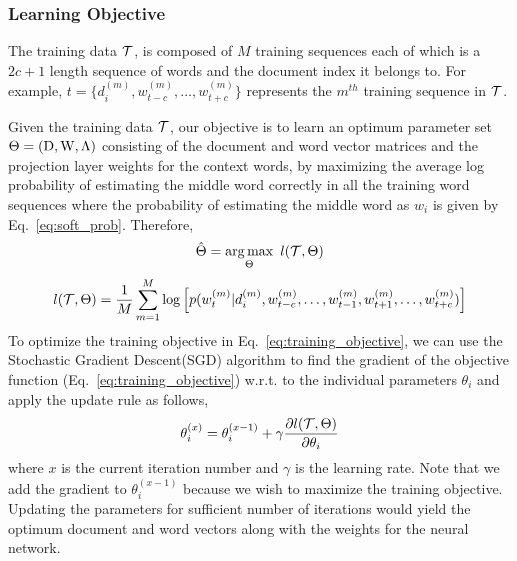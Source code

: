 \subsubsection{Learning Objective}
The training data $\mathcal{T}$, is composed of $M$ training sequences each of which is a $2c+1$ length sequence of words and the document index it belongs to. For example, $t = \{d^{(m)}_{i}, w^{(m)}_{t-c}, \ldots, w^{(m)}_{t+c}\}$ represents the $m^{th}$ training sequence in $\mathcal{T}$.  

Given the training data $\mathcal{T}$, our objective is to learn an optimum parameter set $\Theta = (\mathrm{D}, \mathrm{W}, \Lambda)$ consisting of the document and word vector matrices and the projection layer weights for the context words, by maximizing the average log probability of estimating the middle word correctly in all the training word sequences where the probability of estimating the middle word as $w_{i}$ is given by Eq.~\ref{eq:soft_prob}. Therefore, 
\begin{equation}
\label{eq:paramter_argmax}
\hat{\Theta} =  \operatorname*{arg\,max}_{\Theta}~l(\mathcal{T}, \Theta)
\end{equation}
\begin{equation}
\label{eq:training_objective}
l(\mathcal{T}, \Theta) = \frac{1}{M}\sum_{m=1}^{M} \log \left[p(w^{(m)}_{t} | d^{(m)}_{i}, w^{(m)}_{t-c}, \ldots, w^{(m)}_{t-1}, w^{(m)}_{t+1}, \ldots, w^{(m)}_{t+c})\right]
\end{equation}
To optimize the training objective in Eq.~\ref{eq:training_objective}, we can use the Stochastic Gradient Descent(SGD) algorithm to find the gradient of the objective function (Eq.~\ref{eq:training_objective}) w.r.t. to the individual parameters $\theta_{i}$ and apply the update rule as follows,
\begin{equation}
\label{eq:update_theta}
\theta^{(x)}_{i} = \theta^{(x-1)}_{i} + \gamma\frac{\partial l(\mathcal{T}, \Theta)}{\partial \theta_{i}}
\end{equation}
where $x$ is the current iteration number and $\gamma$ is the learning rate. Note that we add the gradient to $\theta^{(x-1)}_{i}$ because we wish to maximize the training objective.
Updating the parameters for sufficient number of iterations would yield the optimum document and word vectors along with the weights for the neural network.

